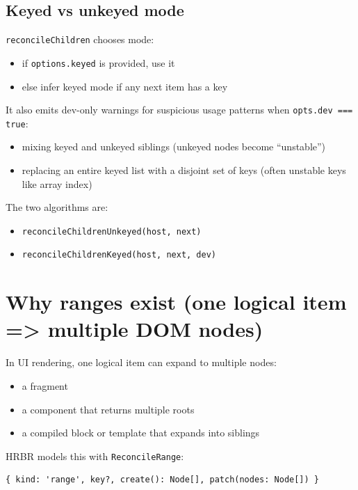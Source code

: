 \subsection{Keyed vs unkeyed mode}

\texttt{reconcileChildren} chooses mode:

\begin{itemize}
  \item if \texttt{options.keyed} is provided, use it
  \item else infer keyed mode if any next item has a key
\end{itemize}

It also emits dev-only warnings for suspicious usage patterns when \texttt{opts.dev === true}:

\begin{itemize}
  \item mixing keyed and unkeyed siblings (unkeyed nodes become “unstable”)
  \item replacing an entire keyed list with a disjoint set of keys (often unstable keys like array index)
\end{itemize}

The two algorithms are:

\begin{itemize}
  \item \texttt{reconcileChildrenUnkeyed(host, next)}
  \item \texttt{reconcileChildrenKeyed(host, next, dev)}
\end{itemize}

\section{Why ranges exist (one logical item => multiple DOM nodes)}

In UI rendering, one logical item can expand to multiple nodes:

\begin{itemize}
  \item a fragment
  \item a component that returns multiple roots
  \item a compiled block or template that expands into siblings
\end{itemize}

HRBR models this with \texttt{ReconcileRange}:

\begin{verbatim}
{ kind: 'range', key?, create(): Node[], patch(nodes: Node[]) }
\end{verbatim}

